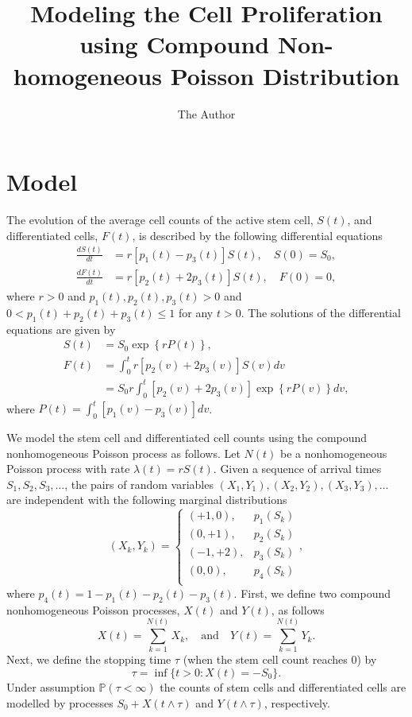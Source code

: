 \documentclass[10pt]{article}
\title{Modeling the Cell Proliferation using Compound Non-homogeneous Poisson Distribution}
\author{The Author}
\date{} %
\newcommand{\PP}{\mathbb{P}}
\begin{document}
\maketitle
\section{Model}
The evolution of the average cell counts of the active stem cell, $S(t)$, and differentiated cells, $F(t)$, is
described by the following differential equations
\begin{equation}\label{count*ODE}
\begin{split}
\frac{dS(t)}{dt} &= r[p_1(t) - p_3(t)] S(t), \quad S(0)=S_0, \\
\frac{dF(t)}{dt} &= r[p_2(t) + 2p_3(t)] S(t), \quad F(0)=0,
\end{split}
\end{equation}
where $r>0$ and  $p_1(t), p_2(t), p_3(t)>0$ and  $0<p_1(t)+p_2(t)+p_3(t)\leq 1$ for any $t>0$. The solutions
of the differential equations are given by
\begin{equation*}
\begin{split}
S(t) & = S_0 \exp \left\{ r P(t) \right\}, \\
F(t) & = \int_0^t r  [p_2(v) + 2p_3(v)] S(v) dv\\
&= S_0  r   \int_0^t [p_2(v) + 2p_3(v)] \exp \left\{r P(v) \right\} dv,
\end{split}
\end{equation*}
where $P(t) = \int_0^t [p_1(v) - p_3(v)] dv$.

We model the stem cell and differentiated cell counts using the compound nonhomogeneous Poisson process as follows.
Let $N(t)$ be a nonhomogeneous Poisson process with rate $\lambda(t) = r S(t)$. Given a sequence of arrival times $S_1, S_2, S_3,\dots$, the pairs of random variables
$(X_1,Y_1), (X_2,Y_2), (X_3,Y_3), \dots$ are independent with the following marginal distributions
\begin{equation*}
(X_k, Y_k) = \begin{cases}
(+1,0),  & p_1(S_k) \\
(0,+1),  & p_2(S_k) \\
(-1,+2), & p_3(S_k) \\
(0,0),   & p_4(S_k)\\
\end{cases},
\end{equation*}
where $p_4(t)=1-p_1(t)-p_2(t)-p_3(t).$
First, we define two compound nonhomogeneous Poisson processes, $X(t)$ and $Y(t)$, as follows
\begin{equation*}
X(t) = \sum_{k=1}^{N(t)} X_{k}, \quad \text{and} \quad
Y(t) = \sum_{k=1}^{N(t)} Y_{k}.
\end{equation*}
Next, we define the stopping time $\tau$ (when the stem cell count reaches 0) by
\begin{equation*}
\tau=\inf\{t>0:X(t)=-S_0\}.
\end{equation*}
Under assumption $\PP(\tau<\infty)$ the counts of stem cells and differentiated cells are modelled by processes $S_0+X(t\wedge\tau)$ and $Y(t\wedge\tau)$, respectively.
\end{document}
